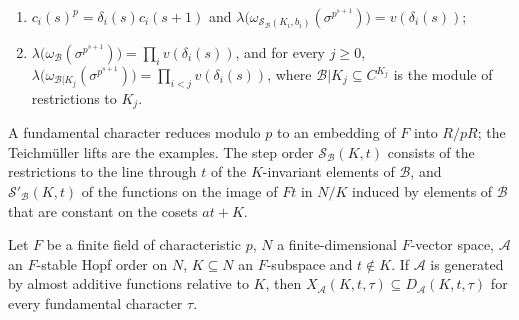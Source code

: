 \begin{definition}
\begin{enumerate}[label=(\alph*)]
\begin{enumerate}[label=(FC\arabic*)]
  \item $c_i(s)^p=\delta_i(s)c_i(s+1)$ and $\lambda\bigl(\omega_{\mathcal S_{\mathcal B}(K_i,b_i)}(\sigma^{p^{s+1}})\bigr)=v(\delta_i(s))$;
  \item $\lambda\bigl(\omega_{\mathcal B}(\sigma^{p^{s+1}})\bigr)=\prod_iv(\delta_i(s))$, and for every $j\ge0$,
    $\lambda\bigl(\omega_{\mathcal B|K_j}(\sigma^{p^{s+1}})\bigr)=\prod_{i<j}v(\delta_i(s))$, where
    $\mathcal B|K_j\subseteq C^{K_j}$ is the module of restrictions to $K_j$.
  \end{enumerate}
\end{enumerate}
\end{definition}

A fundamental character reduces modulo $p$ to an embedding of $F$ into $R/pR$; the Teichm\"uller lifts are the
examples. The step order $\mathcal S_{\mathcal B}(K,t)$ consists of the restrictions to the line through $t$ of the
$K$-invariant elements of $\mathcal B$, and $\mathcal S'_{\mathcal B}(K,t)$ of the functions on the image of $Ft$ in
$N/K$ induced by elements of $\mathcal B$ that are constant on the cosets $at+K$.

\begin{lemma}\label{pf:tower:xled}
Let $F$ be a finite field of characteristic $p$, $N$ a finite-dimensional $F$-vector space, $\mathcal A$ an $F$-stable Hopf order
on $N$, $K\subseteq N$ an $F$-subspace and $t\notin K$. If $\mathcal A$ is generated by almost additive functions relative to
$K$, then $X_{\mathcal A}(K,t,\tau)\subseteq D_{\mathcal A}(K,t,\tau)$ for every fundamental character $\tau$.
\end{lemma}

